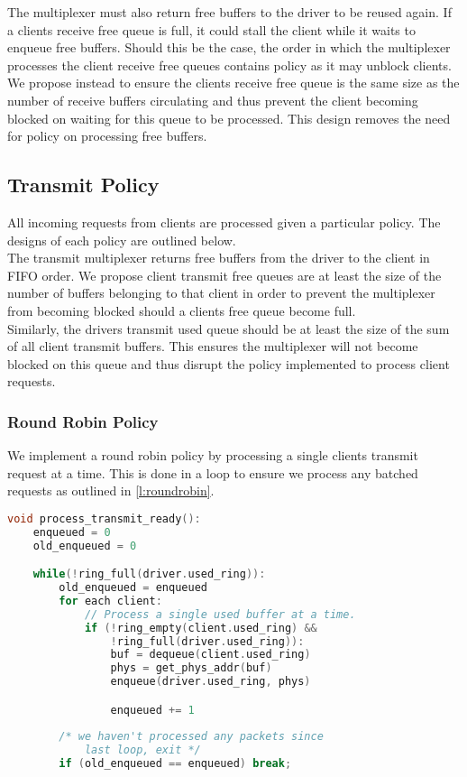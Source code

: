 The multiplexer must also return free buffers to the driver to be reused again. If a clients receive free
queue is full, it could stall the client while it waits to enqueue free buffers. Should this be the case,
the order in which the multiplexer processes the client receive free queues contains policy as it may
unblock clients. We propose instead to ensure the clients receive free queue is the same size as the number
of receive buffers circulating and thus prevent the client becoming blocked on waiting for this queue to be
processed. This design removes the need for policy on processing free buffers. \\ 

\subsection{Transmit Policy}

All incoming requests from clients are processed given a particular policy. The designs of each policy
are outlined below.\\
The transmit multiplexer returns free buffers from the driver to the client in FIFO order.
We propose client transmit free queues are at least the size of the number of buffers
belonging to that client in order to prevent the multiplexer from becoming blocked 
should a clients free queue become full. \\ 
Similarly, the drivers transmit used queue should be at least the size of the sum of 
all client transmit buffers. This ensures the multiplexer will not become blocked on this queue
and thus disrupt the policy implemented to process client requests. \\ 

\subsubsection{Round Robin Policy}
We implement a round robin policy by processing a single clients transmit request at a time.
This is done in a loop to ensure we process any batched requests as outlined in \autoref{l:roundrobin}.

\begin{lstlisting}[tabsize=2, language=C, caption={Transmit Round Robin Policy},frame=tb, 
                    label={l:roundrobin}, captionpos=b]
void process_transmit_ready():
    enqueued = 0
    old_enqueued = 0

    while(!ring_full(driver.used_ring)):
        old_enqueued = enqueued
        for each client:
            // Process a single used buffer at a time. 
            if (!ring_empty(client.used_ring) &&
                !ring_full(driver.used_ring)):
                buf = dequeue(client.used_ring)
                phys = get_phys_addr(buf)
                enqueue(driver.used_ring, phys)

                enqueued += 1
            
        /* we haven't processed any packets since 
            last loop, exit */
        if (old_enqueued == enqueued) break;
\end{lstlisting}

